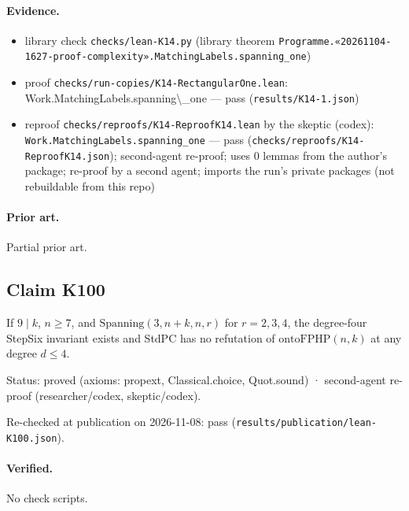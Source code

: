 \documentclass{article}
\begin{document}
\paragraph{Evidence.}
\begin{itemize}
\item library check \texttt{checks/lean-K14.py} (library theorem \texttt{Programme.«20261104-1627-proof-complexity».MatchingLabels.spanning\_one})
\item proof \texttt{checks/run-copies/K14-RectangularOne.lean}: Work.MatchingLabels.spanning\textbackslash{}\_one --- pass (\texttt{results/K14-1.json})
\item reproof \texttt{checks/reproofs/K14-ReproofK14.lean} by the skeptic (codex): \texttt{Work.MatchingLabels.spanning\_one} --- pass (\texttt{checks/reproofs/K14-ReproofK14.json}); second-agent re-proof; uses 0 lemmas from the author's package; re-proof by a second agent; imports the run's private packages (not rebuildable from this repo)
\end{itemize}

\paragraph{Prior art.} Partial prior art.

\subsection*{Claim K100}

If $9\mid k$, $n\ge7$, and $\mathrm{Spanning}(3,n+k,n,r)$ for $r=2,3,4$, the degree-four StepSix invariant exists and StdPC has no refutation of $\mathrm{ontoFPHP}(n,k)$ at any degree $d\le4$.

Status: proved (axioms: propext, Classical.choice, Quot.sound) · second-agent re-proof (researcher/codex, skeptic/codex).

Re-checked at publication on 2026-11-08: pass (\texttt{results/publication/lean-K100.json}).

\paragraph{Verified.}
No check scripts.
\end{document}
